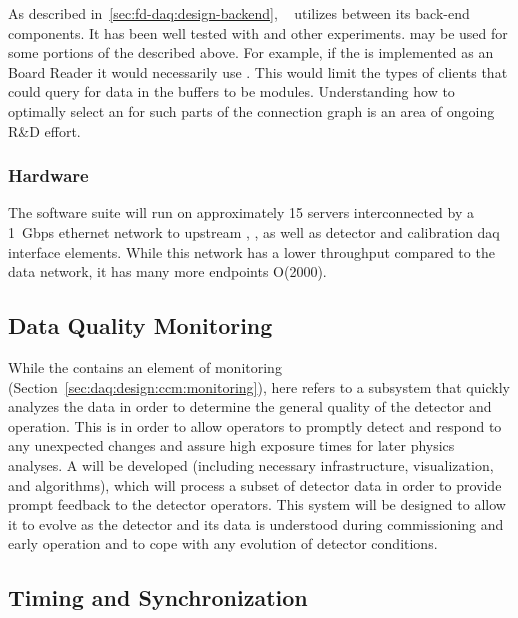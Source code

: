 As described in~\ref{sec:fd-daq:design-backend}, ~\cite{artdaq} utilizes   between its back-end components. 
It has been well tested with  and other experiments. 
 may be used for some portions of the   described above. 
For example, if the  is implemented as an  Board Reader it would necessarily use   . 
This would limit the types of clients that could query for data in the buffers to be  modules. 
Understanding how to optimally select an   for such parts of the  connection graph is an area of ongoing R\&D effort.

\subsubsection{Hardware}
\label{sec:daq:design:ccm:hardware}

The  software suite will run on approximately 15 servers interconnected by a \SI{1}{Gbps} ethernet network to upstream , ,  as well as detector and calibration daq interface elements. While this network has a lower throughput compared to the data network, it has many more endpoints O(2000).

\subsection{Data Quality Monitoring}
\label{sec:fd-daq:design-data-quality}

While the  contains an element of monitoring (Section~\ref{sec:daq:design:ccm:monitoring}), here  refers to a subsystem that quickly analyzes the data in order to determine the general quality of the detector and  operation.
This is in order to allow operators to promptly detect and respond to any unexpected changes and assure high exposure times for later physics analyses. 
A   
will be developed (including necessary infrastructure, visualization,
and algorithms), which will process a subset of detector data in order
to provide prompt feedback to the detector operators. 
This system will be designed to allow it to evolve as the detector and its data is understood during commissioning and early operation and to cope with any evolution of detector conditions.


\subsection{Timing and Synchronization}
\label{sec:sp-daq:design-timing}

